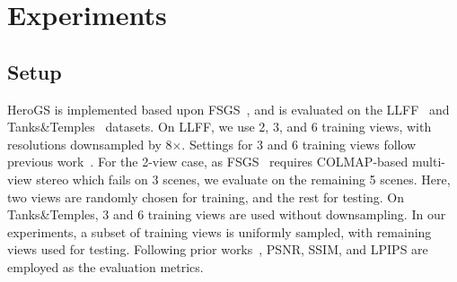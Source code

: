 \section{Experiments}
\subsection{Setup}
\begin{table}[t]
\centering
\renewcommand{\arraystretch}{1.1}
\setlength{\tabcolsep}{1pt}

\caption{\textbf{Quantitative results on Tanks\&Temples with 3, 6 training views without downsampling.}}
\label{tab:QUA_T&T}
\end{table}
HeroGS is implemented based upon FSGS~\cite{zhu2024fsgs}, and is evaluated on the LLFF~\cite{mildenhall2019llff} and Tanks\&Temples~\cite{knapitsch2017tanks} datasets. On LLFF, we use 2, 3, and 6 training views, with resolutions downsampled by 8$\times$. Settings for 3 and 6 training views follow previous work~\cite{jang2025comapgs}. For the 2-view case, as FSGS~\cite{zhu2024fsgs} requires COLMAP-based multi-view stereo which fails on 3 scenes, we evaluate on the remaining 5 scenes. Here, two views are randomly chosen for training, and the rest for testing. On Tanks\&Temples, 3 and 6 training views are used without downsampling. In our experiments, a subset of training views is uniformly sampled, with remaining views used for testing. Following prior works~\cite{zhu2024fsgs,zhang2024cor}, PSNR, SSIM, and LPIPS are employed as the evaluation metrics.

